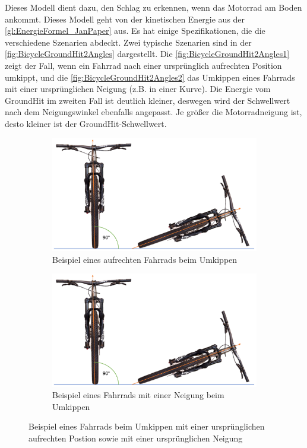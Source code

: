 Dieses Modell dient dazu, den Schlag zu erkennen, wenn das Motorrad am Boden ankommt. Dieses Modell geht von der kinetischen Energie aus der \autoref{gl:EnergieFormel_JanPaper} aus. Es hat einige Spezifikationen, die die verschiedene Szenarien abdeckt. Zwei typische Szenarien sind in der \autoref{fig:BicycleGroundHit2Angles} dargestellt. Die \autoref{fig:BicycleGroundHit2Angles1} zeigt der Fall, wenn ein Fahrrad nach einer ursprünglich aufrechten Position umkippt, und die \autoref{fig:BicycleGroundHit2Angles2} das Umkippen eines Fahrrads mit einer ursprünglichen Neigung (z.B. in einer Kurve).
Die Energie vom GroundHit im zweiten Fall ist deutlich kleiner, deswegen wird der Schwellwert nach dem Neigungswinkel ebenfalls angepasst. Je größer die Motorradneigung ist, desto kleiner ist der GroundHit-Schwellwert.\\

\begin{figure}
	\centering
	\begin{subfigure}{0.49\textwidth}
		\centering
		\includegraphics[page = 1, width=\textwidth]{Bilder/BicycleGroundHit2Angles.pdf}
		\caption{Beispiel eines aufrechten Fahrrads beim Umkippen}
		\label{fig:BicycleGroundHit2Angles1}
	\end{subfigure}
	\begin{subfigure}{0.49\textwidth}
		\centering
		\includegraphics[page = 2, width=\textwidth]{Bilder/BicycleGroundHit2Angles.pdf}
		\caption{Beispiel eines Fahrrads mit einer Neigung beim Umkippen}
		\label{fig:BicycleGroundHit2Angles2}
	\end{subfigure}
	\caption{Beispiel eines Fahrrads beim Umkippen mit einer ursprünglichen aufrechten Postion sowie mit einer ursprünglichen Neigung}
	\label{fig:BicycleGroundHit2Angles}
\end{figure}

